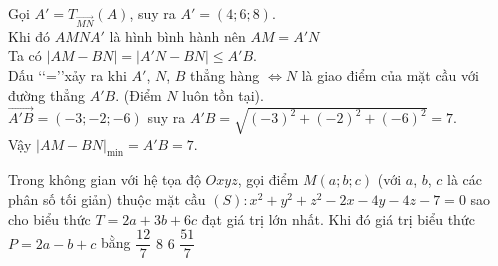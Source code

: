 \begin{ex}
{		Gọi $A'={T_{\overrightarrow{MN}}}(A)$, suy ra $A'=(4;6;8)$.\\
		Khi đó $AMNA'$ là hình bình hành nên $AM=A'N$\\
		Ta có $\left|AM-BN\right|=\left|A'N-BN\right|\le A'B$.\\
		Dấu \lq\lq=\rq\rq xảy ra khi $A'$, $N$, $B$ thẳng hàng $\Leftrightarrow N$ là giao điểm của mặt cầu với đường thẳng $A'B$. (Điểm $N$ luôn tồn tại).\\
		$\overrightarrow{A'B}=(-3;-2;-6)$ suy ra $A'B=\sqrt{(-3)^2+(-2)^2+(-6)^2}=7$.\\
		Vậy ${{\left|AM-BN\right|}_{\min}}=A'B=7$.}
\end{ex}
\begin{ex}%
	Trong không gian với hệ tọa độ $Oxyz$, gọi điểm $M(a;b;c)$ (với $a$, $b$, $c$ là các phân số tối giản) thuộc mặt cầu $(S)\colon x^2+y^2+z^2-2x-4y-4z-7=0$ sao cho biểu thức $T=2a+3b+6c$ đạt giá trị lớn nhất. Khi đó giá trị biểu thức $P=2a-b+c$ bằng
	\choice
	{$\dfrac{12}{7}$}
	{$8$}
	{\True $6$}
	{$\dfrac{51}{7}$}
\end{ex}
